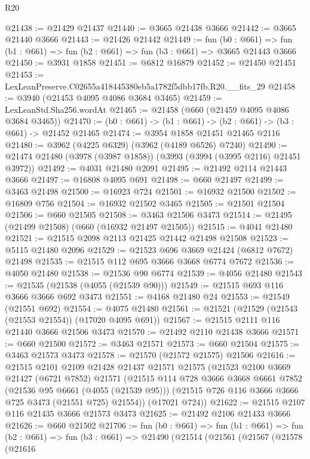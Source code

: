\begin{lexlean}{R20}
\begin{coremodule}
@21438 := @21429 @21437
@21440 := @3665 @21438 @3666
@21442 := @3665 @21440 @3666
@21443 := @21426 @21442
@21449 := fun (b0 : @661) =>
  fun (b1 : @661) => fun (b2 : @661) => fun (b3 : @661) => @3665 @21443 @3666
@21450 := @3931 @1858
@21451 := @6812 @16879
@21452 := @21450 @21451
@21453 := LexLeanPreserve.C02655a418445380eb5a1782f5dbb17fb.R20.__fits_29
@21458 := @3940 (@21453 @4095 @4086 @3684 @3465)
@21459 := LexLeanStd.Sha256.wordAt
@21465 := @21458 (@660 (@21459 @4095 @4086 @3684 @3465))
@21470 := (b0 : @661) -> (b1 : @661) -> (b2 : @661) -> (b3 : @661) -> @21452 @21465
@21474 := @3954 @1858 @21451 @21465 @2116
@21480 := @3962 (@4225 @6329) (@3962 (@4189 @6526) @7240)
@21490 := @21474 @21480 (@3978 (@3987 @1858)) (@3993 (@3994 (@3995 @2116) @21451 @3972))
@21492 := @4031 @21480 @2091
@21495 := @21492 @2114 @21443 @3666
@21497 := @16808 @4095 @691
@21498 := @660 @21497
@21499 := @3463 @21498
@21500 := @16923 @724
@21501 := @16932 @21500
@21502 := @16809 @756
@21504 := @16932 @21502 @3465
@21505 := @21501 @21504
@21506 := @660 @21505
@21508 := @3463 @21506 @3473
@21514 := @21495 (@21499 @21508) (@660 (@16932 @21497 @21505))
@21515 := @4041 @21480
@21521 := @21515 @2098 @2113 @21425 @21442 @21498 @21508
@21523 := @5115 @21480 @2096
@21529 := @21523 @696 @3669 @21424 (@6812 @7672) @21498
@21535 := @21515 @112 @695 @3666 @3668 @6774 @7672
@21536 := @4050 @21480
@21538 := @21536 @90 @6774
@21539 := @4056 @21480
@21543 := @21535 (@21538 (@4055 (@21539 @90)))
@21549 := @21515 @693 @116 @3666 @3666 @692 @3473
@21551 := @4168 @21480 @24
@21553 := @21549 (@21551 @692)
@21554 := @4075 @21480
@21561 := @21521 (@21529 (@21543 (@21553 @21554)) (@17020 @4095 @691))
@21567 := @21515 @2111 @116 @21440 @3666 @21506 @3473
@21570 := @21492 @2110 @21438 @3666
@21571 := @660 @21500
@21572 := @3463 @21571
@21573 := @660 @21504
@21575 := @3463 @21573 @3473
@21578 := @21570 (@21572 @21575) @21506
@21616 := @21515
    @2101
    @2109
    @21428
    @21437
    @21571
    @21575
    (@21523
      @2100
      @3669
      @21427
      (@6721 @7852)
      @21571
      (@21515
        @114
        @728
        @3666
        @3668
        @6661
        @7852
        (@21536 @95 @6661 (@4055 (@21539 @95)))
        (@21515 @726 @116 @3666 @3666 @725 @3473 (@21551 @725) @21554))
      (@17021 @724))
@21622 := @21515 @2107 @116 @21435 @3666 @21573 @3473
@21625 := @21492 @2106 @21433 @3666
@21626 := @660 @21502
@21706 := fun (b0 : @661) =>
  fun (b1 : @661) =>
  fun (b2 : @661) =>
  fun (b3 : @661) =>
  @21490
    (@21514
      (@21561
        (@21567
          (@21578
            (@21616

\end{coremodule}
\end{lexlean}
